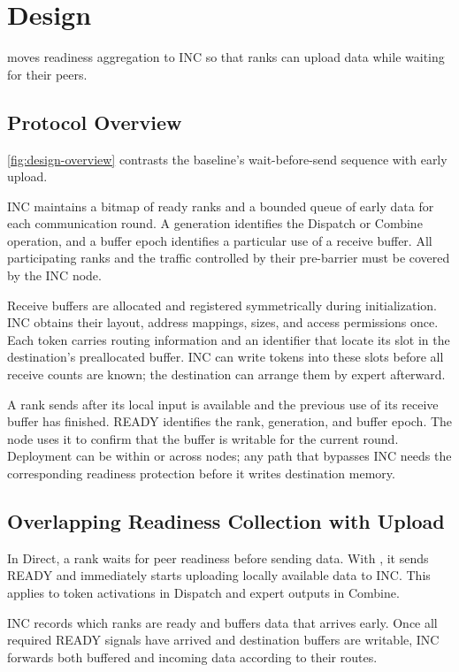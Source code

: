 \section{Design}
\label{sec:design}
\sys{} moves readiness aggregation to INC so that ranks can upload data while waiting for their peers.

\subsection{Protocol Overview}
\label{sec:overview}
\autoref{fig:design-overview} contrasts the baseline's wait-before-send sequence with early upload.

INC maintains a bitmap of ready ranks and a bounded queue of early data for each communication round. A generation identifies the Dispatch or Combine operation, and a buffer epoch identifies a particular use of a receive buffer. All participating ranks and the traffic controlled by their pre-barrier must be covered by the INC node.

Receive buffers are allocated and registered symmetrically during initialization. INC obtains their layout, address mappings, sizes, and access permissions once. Each token carries routing information and an identifier that locate its slot in the destination's preallocated buffer. INC can write tokens into these slots before all receive counts are known; the destination can arrange them by expert afterward.

A rank sends \ready{} after its local input is available and the previous use of its receive buffer has finished. READY identifies the rank, generation, and buffer epoch. The node uses it to confirm that the buffer is writable for the current round. Deployment can be within or across nodes; any path that bypasses INC needs the corresponding readiness protection before it writes destination memory.

\subsection{Overlapping Readiness Collection with Upload}
\label{sec:early-upload}
In Direct, a rank waits for peer readiness before sending data. With \sys{}, it sends READY and immediately starts uploading locally available data to INC. This applies to token activations in Dispatch and expert outputs in Combine.

INC records which ranks are ready and buffers data that arrives early. Once all required READY signals have arrived and destination buffers are writable, INC forwards both buffered and incoming data according to their routes.

